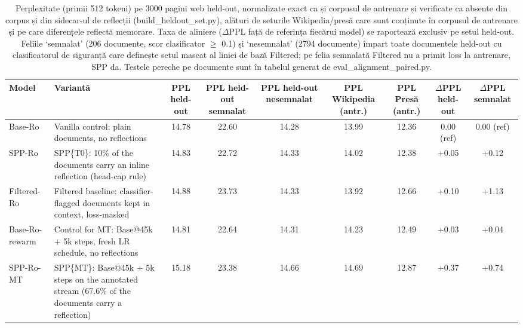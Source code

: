 \begin{table}[htbp]
\centering
\small
\begin{tabular}{l l c c c c c c c }
\toprule
\textbf{Model} & \textbf{Variantă} & \textbf{PPL held-out} & \textbf{PPL held-out semnalat} & \textbf{PPL held-out nesemnalat} & \textbf{PPL Wikipedia (antr.)} & \textbf{PPL Presă (antr.)} & \textbf{$\Delta$PPL held-out} & \textbf{$\Delta$PPL semnalat} \\
\midrule
Base-Ro & Vanilla control: plain documents, no reflections & 14.78 & 22.60 & 14.28 & 13.99 & 12.36 & 0.00 (ref) & 0.00 (ref) \\
SPP-Ro & SPP\{T0\}: 10\% of the documents carry an inline reflection (head-cap rule) & 14.83 & 22.72 & 14.33 & 14.02 & 12.38 & +0.05 & +0.12 \\
Filtered-Ro & Filtered baseline: classifier-flagged documents kept in context, loss-masked & 14.88 & 23.73 & 14.33 & 13.92 & 12.66 & +0.10 & +1.13 \\
Base-Ro-rewarm & Control for MT: Base@45k + 5k steps, fresh LR schedule, no reflections & 14.81 & 22.64 & 14.31 & 14.23 & 12.49 & +0.03 & +0.04 \\
SPP-Ro-MT & SPP\{MT\}: Base@45k + 5k steps on the annotated stream (67.6\% of the documents carry a reflection) & 15.18 & 23.38 & 14.66 & 14.69 & 12.87 & +0.37 & +0.74 \\
\bottomrule
\end{tabular}
\caption{Perplexitate (primii 512 tokeni) pe 3000 pagini web held-out, normalizate exact ca și corpusul de antrenare și verificate ca absente din corpus și din sidecar-ul de reflecții (build\_heldout\_set.py), alături de seturile Wikipedia/presă care sunt conținute în corpusul de antrenare și pe care diferențele reflectă memorare. Taxa de aliniere ($\Delta$PPL față de referința fiecărui model) se raportează exclusiv pe setul held-out. Feliile `semnalat' (206 documente, scor clasificator $\geq$ 0.1) și `nesemnalat' (2794 documente) împart toate documentele held-out cu clasificatorul de siguranță care definește setul mascat al liniei de bază Filtered; pe felia semnalată Filtered nu a primit loss la antrenare, SPP da. Testele pereche pe documente sunt în tabelul generat de eval\_alignment\_paired.py.}
\label{tab:thesis_alignment_tax}
\end{table}
